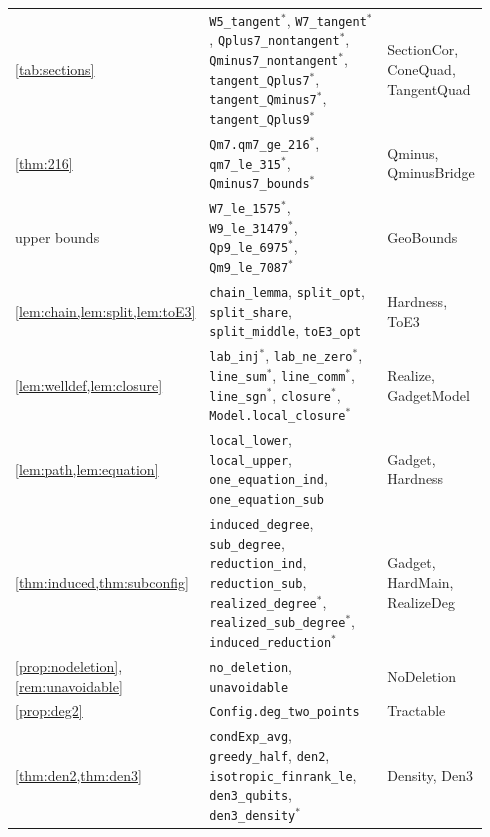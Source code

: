 \documentclass[a4paper,onecolumn,11pt,unpublished,nopdfoutputerror]{quantumarticle}
\theoremstyle{definition}
\newcommand{\lname}[1]{\texttt{\textcolor{leangreen}{#1}}}
\begin{document}
{\begin{longtable}{@{}>{\raggedright\arraybackslash}p{0.2\linewidth}>{\raggedright\arraybackslash}p{0.54\linewidth}>{\raggedright\arraybackslash}p{0.2\linewidth}@{}}
\cref{tab:sections} & \lname{W5\_tangent}$^\ast$, \lname{W7\_tangent}$^\ast$, \lname{Qplus7\_nontangent}$^\ast$, \lname{Qminus7\_nontangent}$^\ast$, \lname{tangent\_Qplus7}$^\ast$, \lname{tangent\_Qminus7}$^\ast$, \lname{tangent\_Qplus9}$^\ast$ & SectionCor, ConeQuad, TangentQuad\\
\cref{thm:216} & \lname{Qm7.qm7\_ge\_216}$^\ast$, \lname{qm7\_le\_315}$^\ast$, \lname{Qminus7\_bounds}$^\ast$ & Qminus, QminusBridge\\
upper bounds & \lname{W7\_le\_1575}$^\ast$, \lname{W9\_le\_31479}$^\ast$, \lname{Qp9\_le\_6975}$^\ast$, \lname{Qm9\_le\_7087}$^\ast$ & GeoBounds\\
\cref{lem:chain,lem:split,lem:toE3} & \lname{chain\_lemma}, \lname{split\_opt}, \lname{split\_share}, \lname{split\_middle}, \lname{toE3\_opt} & Hardness, ToE3\\
\cref{lem:welldef,lem:closure} & \lname{lab\_inj}$^\ast$, \lname{lab\_ne\_zero}$^\ast$, \lname{line\_sum}$^\ast$, \lname{line\_comm}$^\ast$, \lname{line\_sgn}$^\ast$, \lname{closure}$^\ast$, \lname{Model.local\_closure}$^\ast$ & Realize, GadgetModel\\
\cref{lem:path,lem:equation} & \lname{local\_lower}, \lname{local\_upper}, \lname{one\_equation\_ind}, \lname{one\_equation\_sub} & Gadget, Hardness\\
\cref{thm:induced,thm:subconfig} & \lname{induced\_degree}, \lname{sub\_degree}, \lname{reduction\_ind}, \lname{reduction\_sub}, \lname{realized\_degree}$^\ast$, \lname{realized\_sub\_degree}$^\ast$, \lname{induced\_reduction}$^\ast$ & Gadget, HardMain, RealizeDeg\\
\cref{prop:nodeletion}, \cref{rem:unavoidable} & \lname{no\_deletion}, \lname{unavoidable} & NoDeletion\\
\cref{prop:deg2} & \lname{Config.deg\_two\_points} & Tractable\\
\cref{thm:den2,thm:den3} & \lname{condExp\_avg}, \lname{greedy\_half}, \lname{den2}, \lname{isotropic\_finrank\_le}, \lname{den3\_qubits}, \lname{den3\_density}$^\ast$ & Density, Den3\\
\end{longtable}
}
\end{document}
